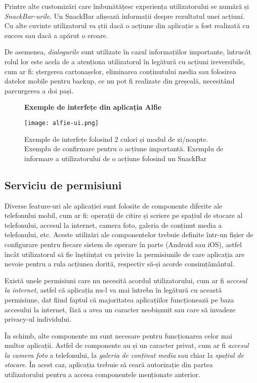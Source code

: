 Printre alte customizări care îmbunătățesc experiența utilizatorului se numără și \textit{SnackBar-urile}. Un SnackBar afișează informații despre rezultatul unei acțiuni. Cu alte cuvinte utilizatorul va știi dacă o acțiune din aplicație a fost realizată cu succes sau dacă a apărut o eroare.

De asemenea, \textit{dialogurile} sunt utilizate în cazul informațiilor importante, întrucât rolul lor este acela de a atenționa utilizatorul în legătură cu acțiuni ireversibile, cum ar fi: ștergerea cartonașelor, eliminarea conținutului media sau folosirea datelor mobile pentru backup, ce nu pot fi realizate din greșeală, necesitând parcurgerea a doi pași.

\begin{figure}[H]
    \centering
    \textbf{Exemple de interfețe din aplicația Alfie}\par\medskip
    \texttt{[image: alfie-ui.png]}
    \caption{Exemple de interfețe folosind 2 culori și modul de zi/noapte. Exemplu de confirmare pentru o acțiune importantă. Exemplu de informare a utilizatorului de o acțiune folosind un SnackBar}
\end{figure}

\subsection{Serviciu de permisiuni}

Diverse feature-uri ale aplicației sunt folosite de componente diferite ale telefonului mobil, cum ar fi: operații de citire și scriere pe spațiul de stocare al telefonului, accesul la internet, camera foto, galeria de conținut media a telefonului, etc. Aceste utilizări ale componentelor trebuie definite într-un fișier de configurare pentru fiecare sistem de operare în parte (Android sau iOS), astfel încât utilizatorul să fie înștiințat cu privire la permisiunile de care aplicația are nevoie pentru a rula acțiunea dorită, respectiv să-și acorde consimțământul.

Există unele permisiuni care nu necesită acordul utilizatorului, cum ar fi \textit{accesul la internet}, astfel că aplicația nu-l va mai întreba în legătură cu această permisiune, dat fiind faptul că majoritatea aplicațiilor funcționează pe baza accesului la internet, fără a avea un caracter neobișnuit sau care să invadeze privacy-ul individului.

În schimb, alte componente nu sunt necesare pentru funcționarea celor mai multor aplicații. Astfel de componente au și un caracter privat, cum ar fi \textit{accesul la camera foto} a telefonului, la \textit{galeria de conținut media} sau chiar la \textit{spațiul de stocare}. În acest caz, aplicația trebuie să ceară autorizație din partea utilizatorului pentru a accesa componentele menționate anterior.

